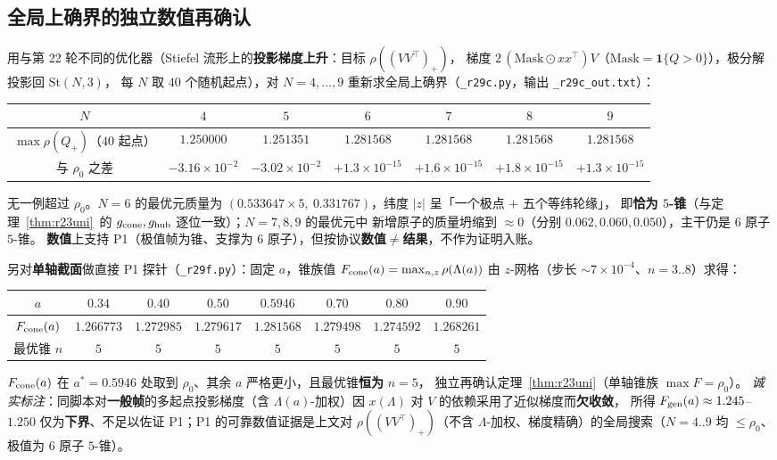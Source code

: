 \documentclass[UTF8,11pt]{ctexart}
\theoremstyle{definition}
\newcommand{\Lam}{\Lambda}
\begin{document}
\subsection{全局上确界的独立数值再确认}\label{sec:r29:num}

用与第 22 轮不同的优化器（Stiefel 流形上的\textbf{投影梯度上升}：目标 $\rho((VV^\top)_+)$，
梯度 $2\,(\mathrm{Mask}\odot xx^\top)V$（$\mathrm{Mask}=\mathbf 1\{Q>0\}$），极分解投影回 $\mathrm{St}(N,3)$，
每 $N$ 取 $40$ 个随机起点），对 $N=4,\dots,9$ 重新求全局上确界（\texttt{\_r29c.py}，输出 \texttt{\_r29c\_out.txt}）：
\begin{center}\small
\begin{tabular}{c|cccccc}
\toprule
$N$ & $4$ & $5$ & $6$ & $7$ & $8$ & $9$\\
\midrule
$\max\rho(Q_+)$（$40$ 起点）& $1.250000$ & $1.251351$ & $\mathbf{1.281568}$ & $1.281568$ & $1.281568$ & $1.281568$\\
与 $\rho_0$ 之差 & $-3.16\times10^{-2}$ & $-3.02\times10^{-2}$ & $+1.3\times10^{-15}$ & $+1.6\times10^{-15}$ & $+1.8\times10^{-15}$ & $+1.3\times10^{-15}$\\
\bottomrule
\end{tabular}
\end{center}
无一例超过 $\rho_0$。$N=6$ 的最优元质量为 $(0.533647\times5,\ 0.331767)$，纬度 $|z|$ 呈「一个极点 $+$ 五个等纬轮缘」，
即\textbf{恰为 $5$-锥}（与定理~\ref{thm:r23uni}~的 $g_{\rm cone},g_{\rm hub}$ 逐位一致）；$N=7,8,9$ 的最优元中
新增原子的质量坍缩到 $\approx0$（分别 $0.062,0.060,0.050$），主干仍是 $6$ 原子 $5$-锥。
\textbf{数值}上支持 P1（极值帧为锥、支撑为 $6$ 原子），但按协议\textbf{数值}$\ne$\textbf{结果}，不作为证明入账。

另对\textbf{单轴截面}做直接 P1 探针（\texttt{\_r29f.py}）：固定 $a$，锥族值 $F_{\rm cone}(a)=\max_{n,z}\rho(\Lam(a))$
由 $z$-网格（步长 $\sim7\times10^{-4}$、$n=3..8$）求得：
\begin{center}\small
\begin{tabular}{c|ccccccc}
\toprule
$a$ & $0.34$ & $0.40$ & $0.50$ & $0.5946$ & $0.70$ & $0.80$ & $0.90$\\
\midrule
$F_{\rm cone}(a)$ & $1.266773$ & $1.272985$ & $1.279617$ & $\mathbf{1.281568}$ & $1.279498$ & $1.274592$ & $1.268261$\\
最优锥 $n$ & $5$ & $5$ & $5$ & $5$ & $5$ & $5$ & $5$\\
\bottomrule
\end{tabular}
\end{center}
$F_{\rm cone}(a)$ 在 $a^*=0.5946$ 处取到 $\rho_0$、其余 $a$ 严格更小，且最优锥\textbf{恒为} $n=5$，
独立再确认定理~\ref{thm:r23uni}（单轴锥族 $\max F=\rho_0$）。
\emph{诚实标注}：同脚本对\textbf{一般帧}的多起点投影梯度（含 $\Lam(a)$-加权）因 $x(\Lam)$ 对 $V$ 的依赖采用了近似梯度而\textbf{欠收敛}，
所得 $F_{\rm gen}(a)\approx1.245$--$1.250$ 仅为\textbf{下界}、不足以佐证 P1；P1 的可靠数值证据是上文对
$\rho((VV^\top)_+)$（不含 $\Lam$-加权、梯度精确）的全局搜索（$N=4..9$ 均 $\le\rho_0$、极值为 $6$ 原子 $5$-锥）。
\end{document}
